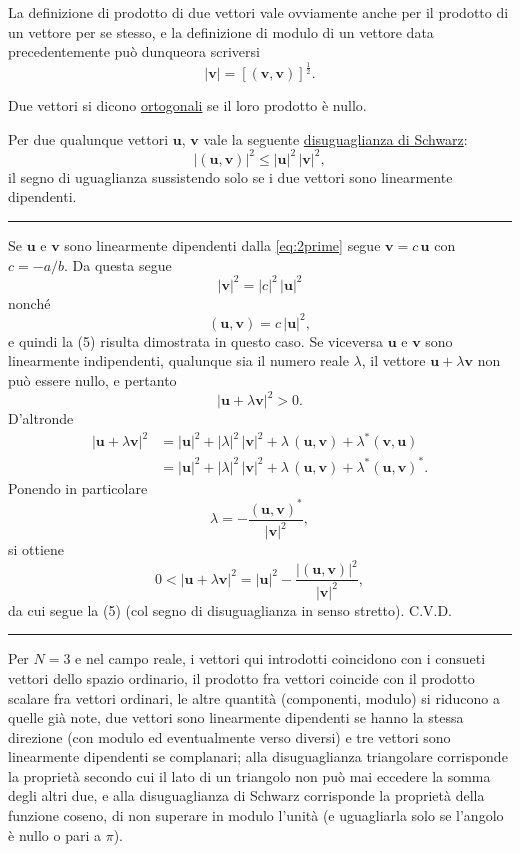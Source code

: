 \documentclass[11pt, a4paper]{book}
\numberwithin{equation}{section}
\begin{document}
La definizione di prodotto di due vettori vale ovviamente anche per il prodotto di un vettore per se stesso, e la definizione di modulo di un vettore data precedentemente può dunqueora scriversi
\begin{equation}
    |\mathbf{v}| = \left[ (\mathbf{v}, \mathbf{v}) \right]^{\frac{1}{2}}.
    \tag{1c}
\end{equation}

Due vettori si dicono \uline{ortogonali} se il loro prodotto è nullo.

Per due qualunque vettori $\mathbf{u}$, $\mathbf{v}$ vale la seguente \uline{disuguaglianza di Schwarz}:
\begin{equation}
    |(\mathbf{u}, \mathbf{v})|^2 \leq |\mathbf{u}|^2\, |\mathbf{v}|^2,
    \tag{5}
\end{equation}
il segno di uguaglianza sussistendo solo se i due vettori sono linearmente dipendenti.

\medskip
\noindent\rule{\linewidth}{0.4pt}

\noindent Se $\mathbf{u}$ e $\mathbf{v}$ sono linearmente dipendenti dalla \eqref{eq:2prime} segue $\mathbf{v} = c\,\mathbf{u}$ con $c = -a/b$. Da questa segue
\[
    |\mathbf{v}|^2 = |c|^2\, |\mathbf{u}|^2
\]
nonché
\[
    (\mathbf{u}, \mathbf{v}) = c\, |\mathbf{u}|^2,
\]
e quindi la (5) risulta dimostrata in questo caso. Se viceversa $\mathbf{u}$ e $\mathbf{v}$ sono linearmente indipendenti, qualunque sia il numero reale $\lambda$, il vettore $\mathbf{u} + \lambda\mathbf{v}$ non può essere nullo, e pertanto
\[
    |\mathbf{u} + \lambda\mathbf{v}|^2 > 0.
\]
D'altronde
\begin{align*}
    |\mathbf{u} + \lambda\mathbf{v}|^2
    &= |\mathbf{u}|^2 + |\lambda|^2\,|\mathbf{v}|^2 + \lambda\,(\mathbf{u},\mathbf{v}) + \lambda^*(\mathbf{v},\mathbf{u}) \\
    &= |\mathbf{u}|^2 + |\lambda|^2\,|\mathbf{v}|^2 + \lambda\,(\mathbf{u},\mathbf{v}) + \lambda^*(\mathbf{u},\mathbf{v})^*.
\end{align*}
Ponendo in particolare
\[
    \lambda = -\frac{(\mathbf{u},\mathbf{v})^*}{|\mathbf{v}|^2},
\]
si ottiene
\[
    0 < |\mathbf{u} + \lambda\mathbf{v}|^2 = |\mathbf{u}|^2 - \frac{|(\mathbf{u},\mathbf{v})|^2}{|\mathbf{v}|^2},
\]
da cui segue la (5) (col segno di disuguaglianza in senso stretto). C.V.D.

\noindent\rule{\linewidth}{0.4pt}
\medskip

Per $N = 3$ e nel campo reale, i vettori qui introdotti coincidono con i consueti vettori dello spazio ordinario, il prodotto fra vettori coincide con il prodotto scalare fra vettori ordinari, le altre quantità (componenti, modulo) si riducono a quelle già note, due vettori sono linearmente dipendenti se hanno la stessa direzione (con modulo ed eventualmente verso diversi) e tre vettori sono linearmente dipendenti se complanari; alla disuguaglianza triangolare corrisponde la proprietà secondo cui il lato di un triangolo non può mai eccedere la somma degli altri due, e alla disuguaglianza di Schwarz corrisponde la proprietà della funzione coseno, di non superare in modulo l'unità (e uguagliarla solo se l'angolo è nullo o pari a $\pi$).
\end{document}
